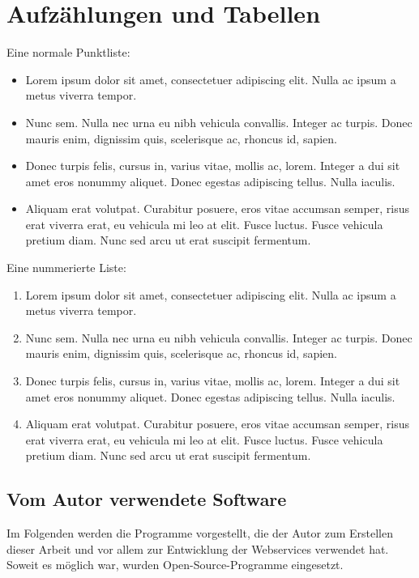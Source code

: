 \chapter{Aufzählungen und Tabellen}

Eine normale Punktliste:
\begin{itemize}
\item Lorem ipsum dolor sit amet, consectetuer adipiscing elit. Nulla ac ipsum a metus viverra tempor. 
\item Nunc sem. Nulla nec urna eu nibh vehicula convallis. Integer ac turpis. Donec mauris enim, dignissim quis, scelerisque ac, rhoncus id, sapien. 
\item Donec turpis felis, cursus in, varius vitae, mollis ac, lorem. Integer a dui sit amet eros nonummy aliquet. Donec egestas adipiscing tellus. Nulla iaculis. 
\item Aliquam erat volutpat. Curabitur posuere, eros vitae accumsan semper, risus erat viverra erat, eu vehicula mi leo at elit. Fusce luctus. Fusce vehicula pretium diam. Nunc sed arcu ut erat suscipit fermentum.
\end{itemize}

Eine nummerierte Liste:
\begin{enumerate}
\item Lorem ipsum dolor sit amet, consectetuer adipiscing elit. Nulla ac ipsum a metus viverra tempor. 
\item Nunc sem. Nulla nec urna eu nibh vehicula convallis. Integer ac turpis. Donec mauris enim, dignissim quis, scelerisque ac, rhoncus id, sapien. 
\item Donec turpis felis, cursus in, varius vitae, mollis ac, lorem. Integer a dui sit amet eros nonummy aliquet. Donec egestas adipiscing tellus. Nulla iaculis. 
\item Aliquam erat volutpat. Curabitur posuere, eros vitae accumsan semper, risus erat viverra erat, eu vehicula mi leo at elit. Fusce luctus. Fusce vehicula pretium diam. Nunc sed arcu ut erat suscipit fermentum.
\end{enumerate}

\section{Vom Autor verwendete Software}
\label{sec:Werkzeuge}
Im Folgenden werden die Programme vorgestellt, die der Autor zum Erstellen dieser Arbeit und vor allem zur Entwicklung der Webservices verwendet hat. Soweit es möglich war, wurden Open-Source-Programme eingesetzt.

